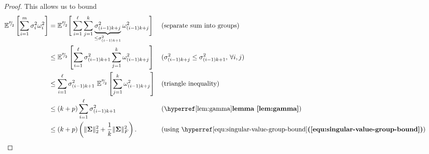 \documentclass[12pt]{article}
\begin{document}
\begin{proof}
    This allows us to bound
    \begin{align}
        \mathbb{E}^{\sfrac{p}{2}}\left[ \sum_{i=1}^{m} \sigma_i^2 \omega_i^2 \right]
        &= \mathbb{E}^{\sfrac{p}{2}}\Bigg[ \sum_{i=1}^{\ell} \sum_{j=1}^{k} \underbrace{\sigma_{(i-1)k + j}^2}_{\leq \sigma_{(i-1)k + 1}^2} \omega_{(i-1)k + j}^2 \Bigg] && \text{(separate sum into groups)} \notag \\
        &\leq \mathbb{E}^{\sfrac{p}{2}}\left[ \sum_{i=1}^{\ell} \sigma_{(i-1)k + 1}^2 \sum_{j=1}^{k} \omega_{(i-1)k + j}^2 \right] && \text{($\sigma_{(i-1)k + j}^2 \leq \sigma_{(i-1)k + 1}^2$, $\forall i, j$)} \notag \\
        &\leq \sum_{i=1}^{\ell} \sigma_{(i-1)k + 1}^2 ~ \mathbb{E}^{\sfrac{p}{2}}\left[ \sum_{j=1}^{k} \omega_{(i-1)k + j}^2 \right] && \text{(triangle inequality)} \notag \\
        &\leq (k + p) \sum_{i=1}^{\ell} \sigma_{(i-1)k + 1}^2 && \text{(\reflem{lem:gamma})} \notag \\
        &\leq (k + p) \left( \lVert \mtx{\Sigma} \rVert _2^2 + \frac{1}{k} \lVert \mtx{\Sigma} \rVert _F^2 \right). && \text{(using \refequ{equ:singular-value-group-bound})}
    \end{align}
    

\end{proof}
\end{document}
